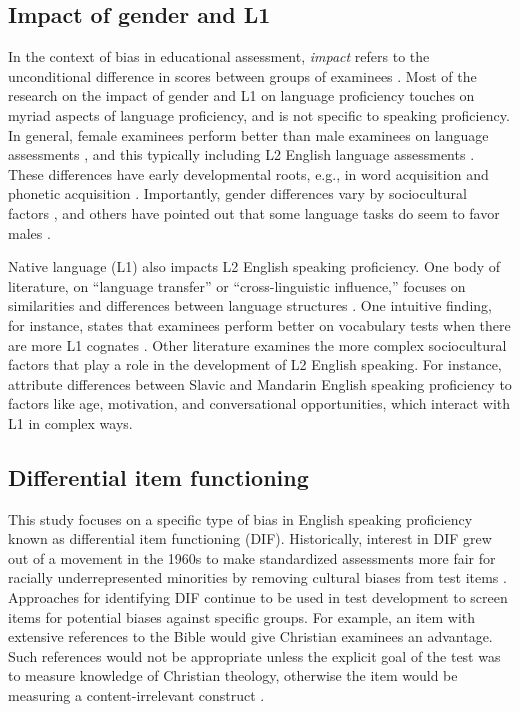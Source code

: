 \documentclass [PhD] {uclathes}
\begin{document}
\subsection{Impact of gender and L1}

In the context of bias in educational assessment, \emph{impact} refers to the unconditional difference in scores between groups of examinees \citep{angoff1993}. Most of the research on the impact of gender and L1 on language proficiency touches on myriad aspects of language proficiency, and is not specific to speaking proficiency. In general, female examinees perform better than male examinees on language assessments \citep{reilly2019gender}, and this typically including L2 English language assessments \citep{denies2022mapping}. These differences have early developmental roots, e.g., in word acquisition \citep{kaushanskaya2013gender} and phonetic acquisition \citep{dodd2003phonological}. Importantly, gender differences vary by sociocultural factors \citep{denies2022mapping}, and others have pointed out that some language tasks do seem to favor males \citep{wucherer2018language}. 

Native language (L1) also impacts L2 English speaking proficiency. One body of literature, on “language transfer” or “cross-linguistic influence,” focuses on similarities and differences between language structures \citep[][p. 257]{brown2000principles}. One intuitive finding, for instance, states that examinees perform better on vocabulary tests when there are more L1 cognates \citep{lesniewska2018first}. Other literature examines the more complex sociocultural factors that play a role in the development of L2 English speaking. For instance, \citet{derwing2013development} attribute differences between Slavic and Mandarin English speaking proficiency to factors like age, motivation, and conversational opportunities, which interact with L1 in complex ways. 

\subsection{Differential item functioning}
\label{intro_dif}

This study focuses on a specific type of bias in English speaking proficiency known as differential item functioning (DIF). Historically, interest in DIF grew out of a movement in the 1960s to make standardized assessments more fair for racially underrepresented minorities by removing cultural biases from test items \citep{angoff1993}. Approaches for identifying DIF continue to be used in test development to screen items for potential biases against specific groups. For example, an item with extensive references to the Bible would give Christian examinees an advantage. Such references would not be appropriate unless the explicit goal of the test was to measure knowledge of Christian theology, otherwise the item would be measuring a content-irrelevant construct \citep{aera2014}.
\end{document}
